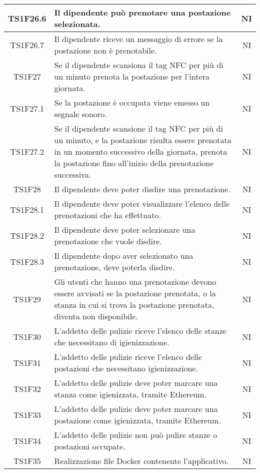 \begin{center}
\begin{longtable}{|c|p{10cm}|c|}
			TS1F26.6 & Il dipendente può prenotare una postazione selezionata. & NI \\	
			\hline
			TS1F26.7 & Il dipendente riceve un messaggio di errore se la postazione non è prenotabile. & NI \\	
			\hline
			TS1F27 & Se il dipendente scansiona il tag NFC per più di un minuto prenota la postazione per l'intera giornata. & NI \\	
			\hline
			TS1F27.1 & Se la postazione è occupata viene emesso un segnale sonoro. & NI \\	
			\hline
			TS1F27.2 & Se il dipendente scansione il tag NFC per più di un minuto, e la postazione risulta essere prenotata in un momento successivo della giornata, prenota la postazione fino all'inizio della prenotazione successiva. & NI \\	
			\hline
			TS1F28 & Il dipendente deve poter disdire una prenotazione. & NI \\	
			\hline
			TS1F28.1 & Il dipendente deve poter visualizzare l'elenco delle prenotazioni che ha effettuato. & NI \\	
			\hline
			TS1F28.2 & Il dipendente deve poter selezionare una prenotazione che vuole disdire. & NI \\	
			\hline
			TS1F28.3 & Il dipendente dopo aver selezionato una prenotazione, deve poterla disdire. & NI \\	
			\hline
			TS1F29 & Gli utenti che hanno una prenotazione devono essere avvisati se la postazione prenotata, o la stanza in cui si trova la postazione prenotata, diventa non disponibile. & NI \\	
			\hline
			TS1F30 & L'addetto delle pulizie riceve l'elenco delle stanze che necessitano di igienizzazione. & NI \\	
			\hline
			TS1F31 & L'addetto delle pulizie riceve l'elenco delle postazioni che necessitano igienizzazione. & NI \\	
			\hline
			TS1F32 & L'addetto delle pulizie deve poter marcare una stanza come igienizzata, tramite Ethereum. & NI \\	
			\hline
			TS1F33 & L'addetto delle pulizie deve poter marcare una postazione come igienizzata, tramite Ethereum. & NI \\	
			\hline
			TS1F34 & L'addetto delle pulizie non può pulire stanze o postazioni occupate. & NI \\	
			\hline
			TS1F35 & Realizzazione file Docker contenente l'applicativo. & NI \\	
			\hline

\end{longtable}
\end{center}
